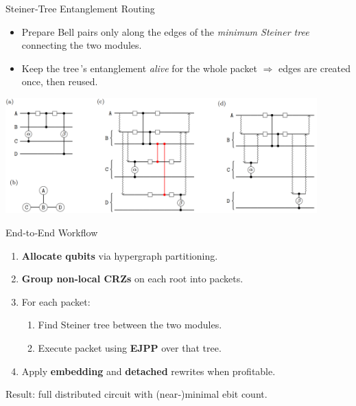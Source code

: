 \documentclass{beamer}
\begin{document}
	
	\begin{frame}{Steiner‑Tree Entanglement Routing}
		\begin{itemize}
			\item Prepare Bell pairs only along the edges of the \textit{minimum Steiner tree} connecting the two modules.
			\item Keep the tree\,'s entanglement \emph{alive} for the whole packet \(\Rightarrow\) edges are created once, then reused.
		\end{itemize}
		\begin{center}
			\includegraphics[width=0.9\textwidth]{figures/tree.png}
		\end{center}	
	\end{frame}
	\begin{frame}{End‑to‑End Workflow}
		\begin{enumerate}
			\item \textbf{Allocate qubits} via hypergraph partitioning.
			\item \textbf{Group non‑local CRZs} on each root into packets.
			\item For each packet:
			\begin{enumerate}
				\item Find Steiner tree between the two modules.
				\item Execute packet using \textbf{EJPP} over that tree.
			\end{enumerate}
			\item Apply \textbf{embedding} and \textbf{detached} rewrites when profitable.
		\end{enumerate}
		\vspace{1em}
		\alert{Result}: full distributed circuit with (near‑)minimal ebit count.
	\end{frame}
	
\end{document}
